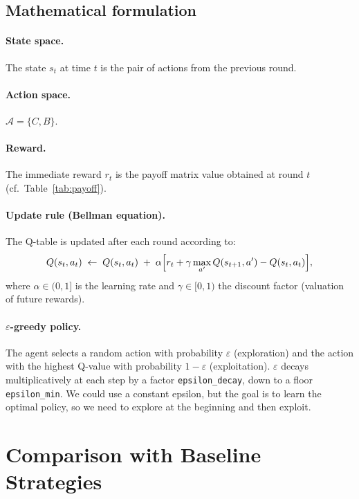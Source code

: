 \documentclass[11pt, a4paper]{article}
\begin{document}
\subsection{Mathematical formulation}

\paragraph{State space.}
The state $s_t$ at time $t$ is the pair of actions from the previous round.

\paragraph{Action space.}
$\mathcal{A} = \{C, B\}$.

\paragraph{Reward.}
The immediate reward $r_t$ is the payoff matrix value obtained at round $t$ (cf.\ Table~\ref{tab:payoff}).

\paragraph{Update rule (Bellman equation).}
The Q-table is updated after each round according to:
\begin{equation}
  Q(s_t, a_t) \;\leftarrow\; Q(s_t, a_t) \;+\; \alpha \Bigl[r_t + \gamma \max_{a'} Q(s_{t+1}, a') - Q(s_t, a_t)\Bigr],
  \label{eq:bellman}
\end{equation}
where $\alpha \in (0,1]$ is the learning rate and $\gamma \in [0,1)$ the discount factor (valuation of future rewards).

\paragraph{$\varepsilon$-greedy policy.}
The agent selects a random action with probability $\varepsilon$ (exploration) and the action with the highest Q-value with probability $1 - \varepsilon$ (exploitation). $\varepsilon$ decays multiplicatively at each step by a factor \texttt{epsilon\_decay}, down to a floor \texttt{epsilon\_min}.
We could use a constant epsilon, but the goal is to learn the optimal policy, so we need to explore at the beginning and then exploit.


\section{Comparison with Baseline Strategies}
\label{sec:baselines}
\end{document}

